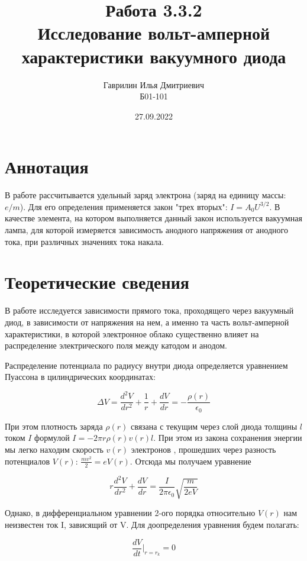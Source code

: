 \documentclass[a4paper, 12pt]{article}%
\date{27.09.2022}
\author{Гаврилин Илья Дмитриевич \\
	Б01-101}
\title{\textbf{Работа 3.3.2 \\ 
		Исследование вольт-амперной характеристики вакуумного диода}}
\begin{document}
	\maketitle
	\section{Аннотация}
	В работе рассчитывается удельный заряд электрона (заряд на единицу массы: $e/m$). Для его определения применяется закон "трех вторых": $I = A_0 U^{3/2}$. В качестве элемента, на котором выполняется данный закон используется вакуумная лампа, для которой измеряется зависимость анодного напряжения от анодного тока, при различных значениях тока накала.
	\section{Теоретические сведения}
	В работе исследуется зависимости прямого тока, проходящего через вакуумный диод, в зависимости от напряжения на нем, а именно та часть вольт-амперной характеристики, в которой электронное облако существенно влияет на распределение электрического поля между катодом и анодом.
	
	Распределение потенциала по радиусу внутри диода определяется уравнением Пуассона в цилиндрических координатах:
	
	\begin{equation}\label{}
		\Delta V = \dfrac{d^2V}{dr^2} + \dfrac{1}{r} + \dfrac{dV}{dr} = - \dfrac{\rho(r)}{\epsilon_0}
	\end{equation}
	
	При этом плотность заряда $ \rho(r) $ связана с текущим через слой диода толщины $ l $ током $ I $ формулой $ I = -2\pi r \rho(r)v(r)l$. При этом из закона сохранения энергии мы легко находим скорость $ v(r) $ электронов , прошедших через разность потенциалов $ V(r) $: $ \frac{mv^2}{2} = eV(r) $.  Отсюда мы получаем уравнение 
	
	\begin{equation}\label{ur}
		r \dfrac{d^2V}{dr^2} + \dfrac{dV}{dr} = \dfrac{I}{2\pi\epsilon_0}\sqrt{\dfrac{m}{2eV}}
	\end{equation}
	
	Однако, в дифференциальном уравнении 2-ого порядка относительно $ V(r) $ нам неизвестен ток I, зависящий от V. Для доопределения уравнения будем полагать:
	
	\begin{equation}\label{usl}
		\dfrac{dV}{dt}\bigg |_{r=r_k} = 0
	\end{equation} 
	
\end{document}
